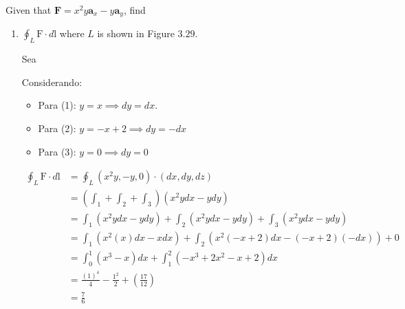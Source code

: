 \begin{problema}
    Given that $\mathbf{F}=x^{2} y \mathbf{a}_{x}-y \mathbf{a}_{y}$, find

    \begin{enumerate}
        \item $\oint_{L} \mathrm{F} \cdot d \mathrm{l}$ where $L$ is shown in Figure $3.29$.
        \begin{sol}
            Sea 
            \begin{cajita}
                Considerando: 
                \begin{itemize}
                    \item Para (1): $y=x\implies dy=dx$. 
                    \item Para (2): $y=-x+2\implies dy=-dx$
                    \item Para (3): $y=0\implies dy=0$
                \end{itemize}
            \end{cajita}
            \begin{align*}
                \oint_{L} \mathrm{F} \cdot d \mathrm{l} &= \oint_L \left(x^2y,-y,0\right)\cdot \left(dx,dy,dz\right)\\
                &=\left(\int_1+\int_2+\int_3\right) \left(x^2ydx -ydy\right)\\
                &= \int_1(x^2ydx -ydy) + \int_2(x^2ydx -ydy)+\int_3(x^2ydx -ydy)\\
                &= \int_1(x^2(x)dx -xdx) + \int_2(x^2(-x+2)dx -(-x+2)(-dx))+0\\
                &= \int_0^1(x^3-x)dx + \int_1^2\left(-x^3+2x^2 -x+2\right)dx\\
                &= \frac{(1)^4}{4}-\frac{1^2}{2}+\left(\frac{17}{12}\right)\\
                &= \frac{7}{6}
            \end{align*}
        \end{sol}


\end{enumerate}
\end{problema}
